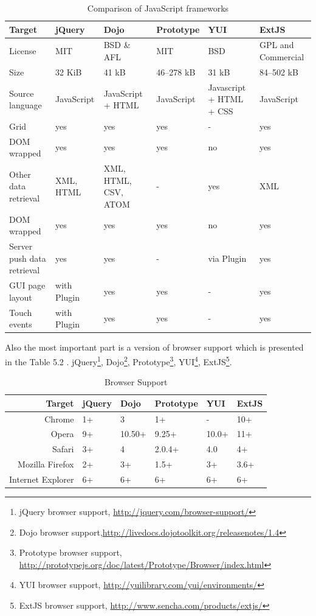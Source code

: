 	\begin{table}[H]
	\centering
	\begin{tabular}{|L{3cm}|l|L{2cm}|l|L{2cm}|L{2cm}|}
	\hline
	Target 			& jQuery & Dojo & Prototype & YUI & ExtJS \\
	\hline
	\hline
	License		& MIT & BSD \& AFL & MIT & BSD & GPL and Commercial \\
	\hline
	Size		& 32 KiB & 41 kB & 46–278 kB & 31 kB & 84–502 kB \\
	\hline
	Source language		& JavaScript & JavaScript + HTML & JavaScript &  Javascript + HTML + CSS & JavaScript \\
	\hline
	Grid		& yes & yes & yes & - & yes  \\
	\hline
	DOM wrapped		& yes & yes & yes & no & yes \\
	\hline
	Other data retrieval		& XML, HTML & XML, HTML, CSV, ATOM & - & yes & XML  \\
	\hline
	DOM wrapped		& yes & yes & yes & no & yes \\
	\hline
	Server push data retrieval		& yes & yes & - & via Plugin & yes \\
	\hline
	GUI page layout		& with Plugin & yes & yes & - & yes \\
	\hline 		
	Touch events		& with Plugin & yes & yes & - & yes \\
	\hline 
	\end{tabular}
	\caption[Comparison of JavaScript frameworks]{Comparison of JavaScript frameworks}
	\label{tab:JS_frameworks}
	\end{table}
	Also the most important part is a version of browser support which is presented in the Table 5.2 . jQuery\footnote{jQuery browser support, \url{http://jquery.com/browser-support/}}, Dojo\footnote{Dojo browser support,\url{http://livedocs.dojotoolkit.org/releasenotes/1.4}}, Prototype\footnote{Prototype browser support, \url{http://prototypejs.org/doc/latest/Prototype/Browser/index.html}}, YUI\footnote{YUI browser support, \url{http://yuilibrary.com/yui/environments/}}, ExtJS\footnote{ExtJS browser support, \url{http://www.sencha.com/products/extjs/}}.

	\begin{table}[H]
	\centering
	\begin{tabular}{|r|l|l|l|l|l|}
	\hline
	Target 			& jQuery & Dojo & Prototype & YUI & ExtJS \\
	\hline
	\hline
	Chrome		& 1+ & 3 & 1+ & - & 10+ \\
	\hline
	Opera		& 9+ & 10.50+ & 9.25+ & 10.0+ & 11+ \\
	\hline
	Safari		& 3+ & 4 & 2.0.4+ & 4.0 & 4+ \\
	\hline
	Mozilla Firefox		& 2+ & 3+ & 1.5+ & 3+ & 3.6+ \\
	\hline
	Internet Explorer		& 6+ & 6+ & 6+ & 6+ & 6+ \\
	\hline
	\end{tabular}
	\caption[Browser Support]{Browser Support}
	\end{table}

